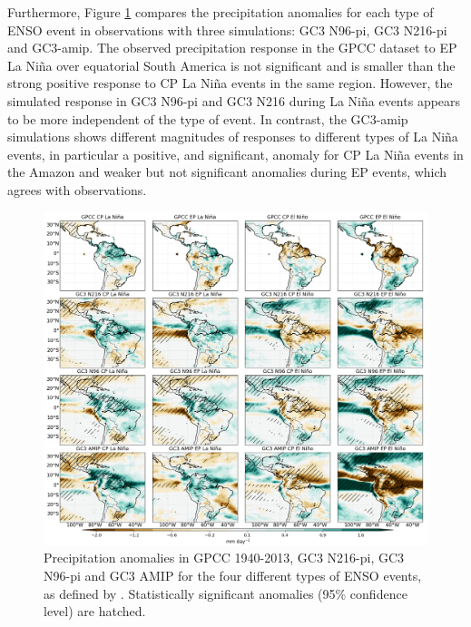 Furthermore, Figure \ref{fig:senso} compares the precipitation anomalies for each type of ENSO event in observations with three simulations: GC3 N96-pi, GC3 N216-pi and GC3-amip. 
The observed precipitation response in the GPCC dataset to EP La Niña over equatorial South America is not significant and is smaller than the strong positive response to CP La Niña events in the same region. However,  the simulated response in GC3 N96-pi and GC3 N216 during La Niña events appears to be more independent of the type of event. In contrast, the GC3-amip simulations shows different magnitudes of responses to different types of La Niña events, in particular a positive, and significant, anomaly for CP La Niña events in the Amazon and weaker but not significant anomalies during EP events, which agrees with observations.

\begin{figure}[t!]
\includegraphics[width=\linewidth]{figures/cppranomalies_ff}
\caption[Precipitation anomalies to different ENSO flavours]{Precipitation anomalies in GPCC 1940-2013, GC3 N216-pi, GC3 N96-pi and GC3 AMIP for the four different types of ENSO events, as defined by \cite{cai2020}. Statistically significant anomalies (95\% confidence level) are hatched.}
\label{fig:senso}
\end{figure}  

